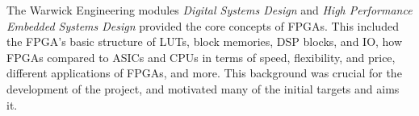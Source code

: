 The Warwick Engineering modules \textit{Digital Systems Design} \cite{es3b2} and \textit{High Performance Embedded Systems Design} \cite{es3f1} provided the core concepts of FPGAs. This included the FPGA's basic structure of LUTs, block memories, DSP blocks, and IO, how FPGAs compared to ASICs and CPUs in terms of speed, flexibility, and price, different applications of FPGAs, and more. This background was crucial for the development of the project, and motivated many of the initial targets and aims it.


